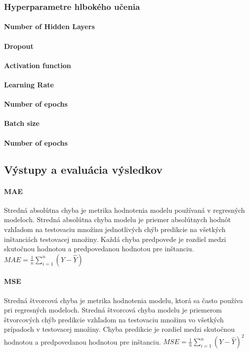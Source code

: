 \subsubsection{Hyperparametre hlbokého učenia}
\paragraph{Number of Hidden Layers}
\paragraph{Dropout}
\paragraph{Activation function}

\paragraph{Learning Rate}
\paragraph{Number of epochs}
\paragraph{Batch size}
\paragraph{Number of epochs}

\subsection{Výstupy a evaluácia výsledkov}

\paragraph{MAE} Stredná absolútna chyba je metrika hodnotenia modelu používaná v regresných modeloch. Stredná absolútna chyba modelu je priemer absolútnych hodnôt vzhľadom na testovaciu množinu jednotlivých chýb predikcie na všetkých inštanciách testovacej množiny. Každá chyba predpovede je rozdiel medzi skutočnou hodnotou a predpovedanou hodnotou pre inštanciu. \newline
$MAE = {\frac{1}{n}\sum_{i=1}^{n}(Y-\widehat{Y})}$

\paragraph{MSE} Stredná štvorcová chyba je metrika hodnotenia modelu, ktorá sa často používa pri regresných modeloch. Stredná štvorcová chyba modelu je priemerom štvorcových chýb predikcie vzhľadom na testovaciu množinu vo všetkých prípadoch v testovacej množiny. Chyba predikcie je rozdiel medzi skutočnou hodnotou a predpovedanou hodnotou pre inštanciu. \newline
$MSE = {\frac{1}{n}\sum_{i=1}^{n}(Y-\widehat{Y})^{2}}$

